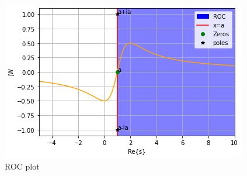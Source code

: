 \documentclass[journal,12pt,twocolumn]{IEEEtran}
\begin{document}
\begin{figure}[htp]
    \centering
    \includegraphics[width = \columnwidth]{fig.png}
    \caption{ROC plot}
    \label{fig:my_label}
\end{figure}
\end{document}
